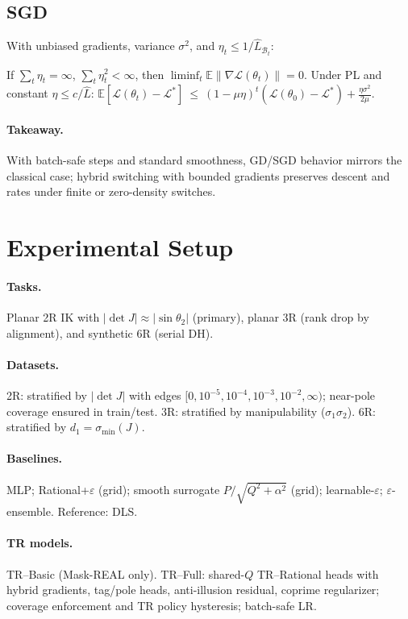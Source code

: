 \documentclass[twoside,11pt]{article}
\begin{document}
\subsection*{SGD} With unbiased gradients, variance $\sigma^2$, and $\eta_t\le 1/\widehat L_{\mathcal{B}_t}$:
\begin{theorem}\label{thm:sgd}
If $\sum_t\eta_t=\infty$, $\sum_t\eta_t^2<\infty$, then $\liminf_t\mathbb{E}\|\nabla\mathcal{L}(\theta_t)\|=0$. Under PL and constant $\eta\le c/\widehat L$:
$\mathbb{E}[\mathcal{L}(\theta_t)-\mathcal{L}^*]\ \le\ (1-\mu\eta)^t(\mathcal{L}(\theta_0)-\mathcal{L}^*) + \tfrac{\eta\sigma^2}{2\mu}$.
\end{theorem}
\paragraph{Takeaway.} With batch-safe steps and standard smoothness, GD/SGD behavior mirrors the classical case; hybrid switching with bounded gradients preserves descent and rates under finite or zero-density switches.

\section*{Experimental Setup}
\label{sec:exp-setup}
\paragraph{Tasks.} Planar 2R IK with $|\det J|\approx |\sin\theta_2|$ (primary), planar 3R (rank drop by alignment), and synthetic 6R (serial DH).
\paragraph{Datasets.} 2R: stratified by $|\det J|$ with edges $[0,10^{-5},10^{-4},10^{-3},10^{-2},\infty)$; near-pole coverage ensured in train/test. 3R: stratified by manipulability ($\sigma_1\sigma_2$). 6R: stratified by $d_1=\sigma_{\min}(J)$.
\paragraph{Baselines.} MLP; Rational+$\varepsilon$ (grid); smooth surrogate $P/\sqrt{Q^2+\alpha^2}$ (grid); learnable-$\varepsilon$; $\varepsilon$-ensemble. Reference: DLS.
\paragraph{TR models.} TR--Basic (Mask-REAL only). TR--Full: shared-$Q$ TR--Rational heads with hybrid gradients, tag/pole heads, anti-illusion residual, coprime regularizer; coverage enforcement and TR policy hysteresis; batch-safe LR.
\end{document}
